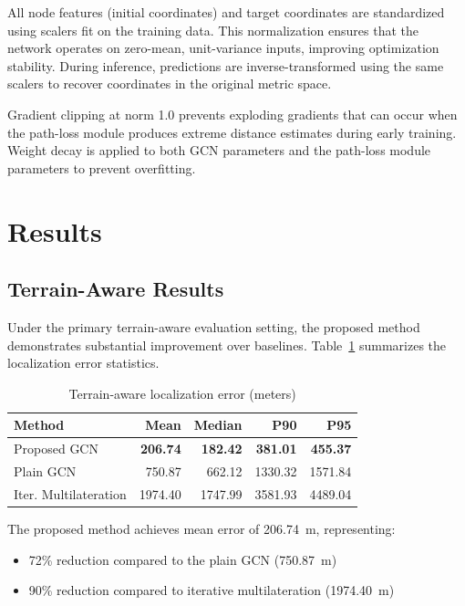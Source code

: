 \documentclass[master,final,11pt]{iscs-thesis}
\begin{document}
All node features (initial coordinates) and target coordinates are standardized using scalers fit on the training data.
This normalization ensures that the network operates on zero-mean, unit-variance inputs, improving optimization stability.
During inference, predictions are inverse-transformed using the same scalers to recover coordinates in the original metric space.

Gradient clipping at norm 1.0 prevents exploding gradients that can occur when the path-loss module produces extreme distance estimates during early training.
Weight decay is applied to both GCN parameters and the path-loss module parameters to prevent overfitting.

\section{Results}
\label{sec:infra_results}

\subsection{Terrain-Aware Results}

Under the primary terrain-aware evaluation setting, the proposed method demonstrates substantial improvement over baselines.
Table~\ref{tab:terrain_results} summarizes the localization error statistics.

\begin{table}[htbp]
\centering
\caption{Terrain-aware localization error (meters)}
\label{tab:terrain_results}
\begin{tabular}{@{}lrrrr@{}}
\toprule
\textbf{Method} & \textbf{Mean} & \textbf{Median} & \textbf{P90} & \textbf{P95} \\
\midrule
Proposed GCN & \textbf{206.74} & \textbf{182.42} & \textbf{381.01} & \textbf{455.37} \\
Plain GCN & 750.87 & 662.12 & 1330.32 & 1571.84 \\
Iter. Multilateration & 1974.40 & 1747.99 & 3581.93 & 4489.04 \\
\bottomrule
\end{tabular}
\end{table}

The proposed method achieves mean error of 206.74~m, representing:
\begin{itemize}
    \item 72\% reduction compared to the plain GCN (750.87~m)
    \item 90\% reduction compared to iterative multilateration (1974.40~m)
\end{itemize}
\end{document}
